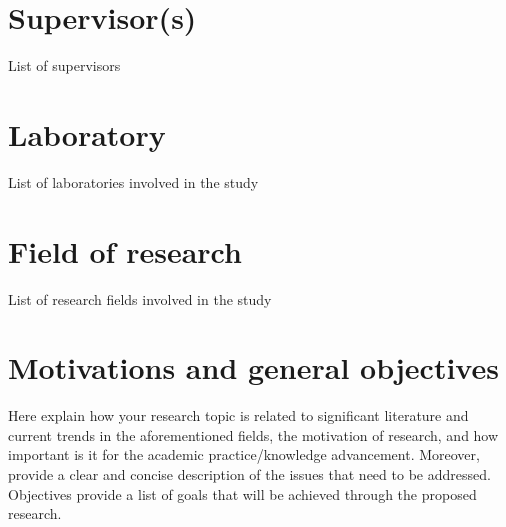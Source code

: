 \documentclass[]{cv-style} %
\begin{document}

\section{Supervisor(s)}
List of supervisors




\section{Laboratory}
List of laboratories involved in the study


\section{Field of research}
List of research fields involved in the study 


\section{Motivations and general objectives}
Here explain how your research topic is related to significant literature and current trends in the aforementioned fields, the motivation of research, and how important is it for the academic practice/knowledge advancement. Moreover, provide a clear and concise description of the issues that need to be addressed. Objectives provide a list of goals that will be achieved through the proposed research. 

\end{document}
